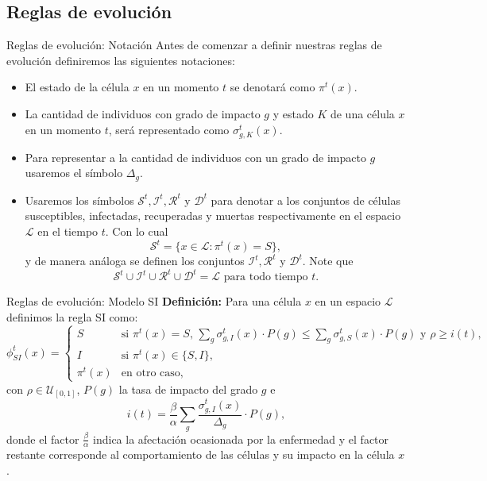 \documentclass[9pt]{beamer}
\begin{document}
\subsection{Reglas de evolución}
\begin{frame}{Reglas de evolución: Notación}
Antes de comenzar a definir nuestras reglas de evolución definiremos las siguientes notaciones:
\begin{itemize}
    \item El estado de la célula $x$ en un momento $t$ se denotará como $\pi^t(x)$.
    \item La cantidad de individuos con grado de impacto $g$ y estado $K$ de una célula $x$ en un momento $t$, será representado como $\sigma_{g,K}^t(x)$.
    \item Para representar a la cantidad de individuos con un grado de impacto $g$ usaremos el símbolo $\Delta_g$. 
    \item Usaremos los símbolos $\mathcal{S}^t,\mathcal{I}^t,\mathcal{R}^t$ y $\mathcal{D}^t$ para denotar a los conjuntos de células susceptibles, infectadas, recuperadas y muertas respectivamente en el espacio $\mathcal{L}$ en el tiempo $t$. Con lo cual
    $$\mathcal{S}^t=\{x\in\mathcal{L}:\pi^t(x)=S\},$$
    y de manera análoga se definen los conjuntos $\mathcal{I}^t,\mathcal{R}^t$ y $\mathcal{D}^t$. Note que $$\mathcal{S}^t\cup\mathcal{I}^t\cup\mathcal{R}^t\cup\mathcal{D}^t=\mathcal{L}\text{ para todo tiempo }t.$$
\end{itemize}
\end{frame}

\begin{frame}{Reglas de evolución: Modelo SI}
\textbf{Definición:} Para una célula $x$ en un espacio $\mathcal{L}$ definimos la regla SI como:
\begin{equation}
    \phi_{SI}^t(x)=\left\{\begin{array}{ll}
        S & \text{si }\pi^t(x)=S\text{, }\sum_g{\sigma_{g,I}^t(x)\cdot P(g)}\leq \sum_g{\sigma_{g,S}^t(x)\cdot P(g)}\text{ y }\rho\geq i(t),\\
        I & \text{si }\pi^t(x)\in\{S,I\}\text{,} \\
        \pi^t(x) & \text{en otro caso,}
    \end{array}\right.
\end{equation}
con $\rho\in\mathcal{U}_{[0,1]}$, $P(g)$ la tasa de impacto del grado $g$ e
\begin{equation}
    i(t) = \frac{\beta}{\alpha}\sum_g{\frac{\sigma_{g,I}^t(x)}{\Delta_g}}\cdot P(g),
\end{equation}
donde el factor $\frac{\beta}{\alpha}$ indica la afectación ocasionada por la enfermedad y el factor restante corresponde al comportamiento de las células y su impacto en la célula $x$.
\end{frame}
\end{document}
